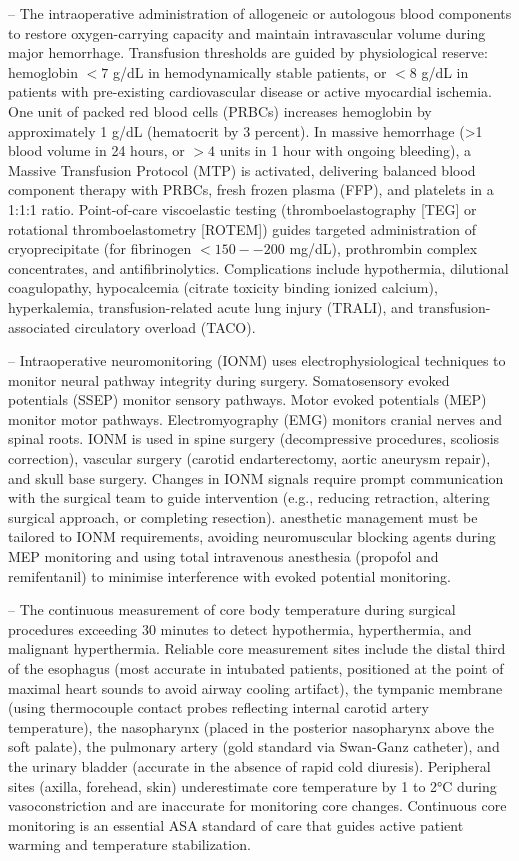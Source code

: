 -- The intraoperative administration of allogeneic or autologous blood components to restore oxygen-carrying capacity and maintain intravascular volume during major hemorrhage. Transfusion thresholds are guided by physiological reserve: hemoglobin $<7$ g/dL in hemodynamically stable patients, or $<8$ g/dL in patients with pre-existing cardiovascular disease or active myocardial ischemia. One unit of packed red blood cells (PRBCs) increases hemoglobin by approximately 1 g/dL (hematocrit by 3 percent). In massive hemorrhage (>1 blood volume in 24 hours, or $>4$ units in 1 hour with ongoing bleeding), a Massive Transfusion Protocol (MTP) is activated, delivering balanced blood component therapy with PRBCs, fresh frozen plasma (FFP), and platelets in a 1:1:1 ratio. Point-of-care viscoelastic testing (thromboelastography [TEG] or rotational thromboelastometry [ROTEM]) guides targeted administration of cryoprecipitate (for fibrinogen $<150--200$ mg/dL), prothrombin complex concentrates, and antifibrinolytics. Complications include hypothermia, dilutional coagulopathy, hypocalcemia (citrate toxicity binding ionized calcium), hyperkalemia, transfusion-related acute lung injury (TRALI), and transfusion-associated circulatory overload (TACO).

-- Intraoperative neuromonitoring (IONM) uses electrophysiological techniques to monitor neural pathway integrity during surgery. Somatosensory evoked potentials (SSEP) monitor sensory pathways. Motor evoked potentials (MEP) monitor motor pathways. Electromyography (EMG) monitors cranial nerves and spinal roots. IONM is used in spine surgery (decompressive procedures, scoliosis correction), vascular surgery (carotid endarterectomy, aortic aneurysm repair), and skull base surgery. Changes in IONM signals require prompt communication with the surgical team to guide intervention (e.g., reducing retraction, altering surgical approach, or completing resection). anesthetic management must be tailored to IONM requirements, avoiding neuromuscular blocking agents during MEP monitoring and using total intravenous anesthesia (propofol and remifentanil) to minimise interference with evoked potential monitoring.

-- The continuous measurement of core body temperature during surgical procedures exceeding 30 minutes to detect hypothermia, hyperthermia, and malignant hyperthermia. Reliable core measurement sites include the distal third of the esophagus (most accurate in intubated patients, positioned at the point of maximal heart sounds to avoid airway cooling artifact), the tympanic membrane (using thermocouple contact probes reflecting internal carotid artery temperature), the nasopharynx (placed in the posterior nasopharynx above the soft palate), the pulmonary artery (gold standard via Swan-Ganz catheter), and the urinary bladder (accurate in the absence of rapid cold diuresis). Peripheral sites (axilla, forehead, skin) underestimate core temperature by 1 to 2°C during vasoconstriction and are inaccurate for monitoring core changes. Continuous core monitoring is an essential ASA standard of care that guides active patient warming and temperature stabilization.

